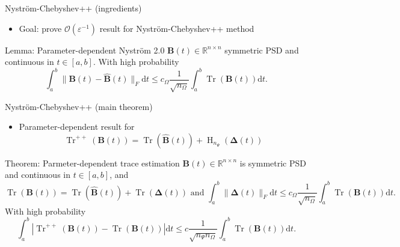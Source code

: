 \documentclass[aspectratio=169, leqno, 12pt]{beamer}
\newcommand{\mtx}[1]{\boldsymbol{#1}}
\DeclareMathOperator{\Tr}{Tr}
\DeclareMathOperator{\Hutch}{H}
\begin{document}
\begin{frame}{Nystr\"om-Chebyshev++ (ingredients)}
    \begin{itemize}
        \item Goal: prove $\mathcal{O}(\varepsilon^{-1})$ result for Nystr\"om-Chebyshev++ method
    \end{itemize}
    \begin{block}{Lemma: Parameter-dependent Nystr\"om 2.0 \cite{he2023parameter}}
        $\mtx{B}(t) \in \mathbb{R}^{n \times n}$ symmetric \gls{PSD} and
        continuous in $t \in [a, b]$. With high probability
        \begin{equation}
            \int_{a}^{b} \lVert \mtx{B}(t) - \widehat{\mtx{B}}(t) \rVert _F \mathrm{d}t \leq c_{\Omega} \frac{1}{\sqrt{n_{\Omega}}} \int_{a}^{b} \Tr(\mtx{B}(t)) \mathrm{d}t.
        \end{equation}
    \end{block}
\end{frame}

\begin{frame}{Nystr\"om-Chebyshev++ (main theorem)}
    \begin{itemize}
        \item Parameter-dependent result for \cite{meyer2021hutch}
        \begin{equation}
            \Tr^{++}(\mtx{B}(t)) = \Tr(\widehat{\mtx{B}}(t)) + \Hutch_{n_{\Psi}}(\mtx{\Delta}(t))
        \end{equation}
    \end{itemize}
    \begin{block}{Theorem: Parmeter-dependent trace estimation}
        $\mtx{B}(t) \in \mathbb{R}^{n \times n}$ is symmetric \gls{PSD}
        and continuous in $t \in [a, b]$, and
        \begin{equation}
            \Tr(\mtx{B}(t)) = \Tr(\widehat{\mtx{B}}(t)) + \Tr(\mtx{\Delta}(t)) \text{ and } \int_{a}^{b} \lVert \mtx{\Delta}(t) \rVert _F \mathrm{d}t \leq c_{\Omega} \frac{1}{\sqrt{n_{\Omega}}} \int_{a}^{b} \Tr(\mtx{B}(t)) \mathrm{d}t.
        \end{equation}
        With high probability
        \begin{equation}
            \int_{a}^{b} |\Tr^{++}(\mtx{B}(t)) - \Tr(\mtx{B}(t))| \mathrm{d}t \leq c \frac{1}{\sqrt{n_{\Psi} n_{\Omega}}} \int_{a}^{b} \Tr(\mtx{B}(t)) \mathrm{d}t.
        \end{equation}
    \end{block}
\end{frame}
\end{document}
